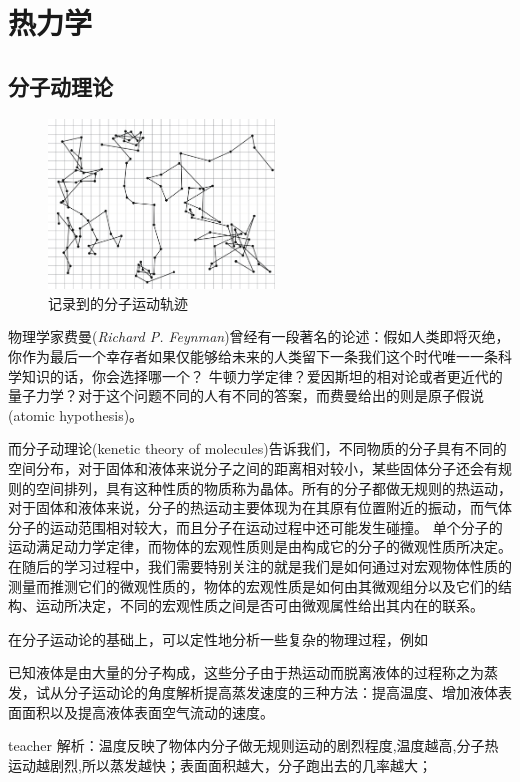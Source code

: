 

\chapter{热力学}

\section{分子动理论}
 \begin{figure}
 	\includegraphics[width=6cm]{images/thermal-20.pdf}
 	\caption{记录到的分子运动轨迹}\label{fig: }
 \end{figure}
物理学家费曼(\textit{Richard P. Feynman})曾经有一段著名的论述：假如人类即将灭绝，你作为最后一个幸存者如果仅能够给未来的人类留下一条我们这个时代唯一一条科学知识的话，你会选择哪一个？
牛顿力学定律？爱因斯坦的相对论或者更近代的量子力学？对于这个问题不同的人有不同的答案，而费曼给出的则是{\heiti 原子假说}(atomic hypothesis)。

而{\heiti 分子动理论}(kenetic theory of molecules)告诉我们，不同物质的分子具有不同的空间分布，对于固体和液体来说分子之间的距离相对较小，某些固体分子还会有规则的空间排列，具有这种性质的物质称为晶体。所有的分子都做无规则的热运动，对于固体和液体来说，分子的热运动主要体现为在其原有位置附近的振动，而气体分子的运动范围相对较大，而且分子在运动过程中还可能发生碰撞。
单个分子的运动满足动力学定律，而物体的宏观性质则是由构成它的分子的微观性质所决定。在随后的学习过程中，我们需要特别关注的就是我们是如何通过对宏观物体性质的测量而推测它们的微观性质的，物体的宏观性质是如何由其微观组分以及它们的结构、运动所决定，不同的宏观性质之间是否可由微观属性给出其内在的联系。


在分子运动论的基础上，可以定性地分析一些复杂的物理过程，例如
\begin{example}
已知液体是由大量的分子构成，这些分子由于热运动而脱离液体的过程称之为蒸发，试从分子运动论的角度解析提高蒸发速度的三种方法：提高温度、增加液体表面面积以及提高液体表面空气流动的速度。
\begin{taggedblock}{teacher}
\newline
解析：温度反映了物体内分子做无规则运动的剧烈程度,温度越高,分子热运动越剧烈,所以蒸发越快；表面面积越大，分子跑出去的几率越大；
\end{taggedblock}
\end{example}


